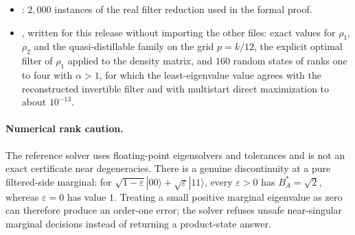 \begin{itemize}[leftmargin=1.5em]
including exact activation signs and exact cubic roots.
\item {}: $2{,}000$ instances of the real
filter reduction used in the formal proof.
\item {}, written for this release without importing
the other files: exact values for $\rho_1$, $\rho_2$ and the
quasi-distillable family on the grid $p=k/12$, the explicit optimal filter
of $\rho_1$ applied to the density matrix, and $160$ random states of ranks
one to four with $\alpha>1$, for which the least-eigenvalue value agrees
with the reconstructed invertible filter and with multistart direct
maximization to about $10^{-13}$.
\end{itemize}

\paragraph{Numerical rank caution.}
The reference solver uses floating-point eigensolvers and tolerances and is
not an exact certificate near degeneracies. There is a genuine
discontinuity at a pure filtered-side marginal: for
$\sqrt{1-\varepsilon}|00\rangle+\sqrt\varepsilon|11\rangle$, every
$\varepsilon>0$ has $B_A^*=\sqrt2$, whereas $\varepsilon=0$ has value $1$.
Treating a small positive marginal eigenvalue as zero can therefore produce
an order-one error; the solver refuses unsafe near-singular marginal
decisions instead of returning a product-state answer.
